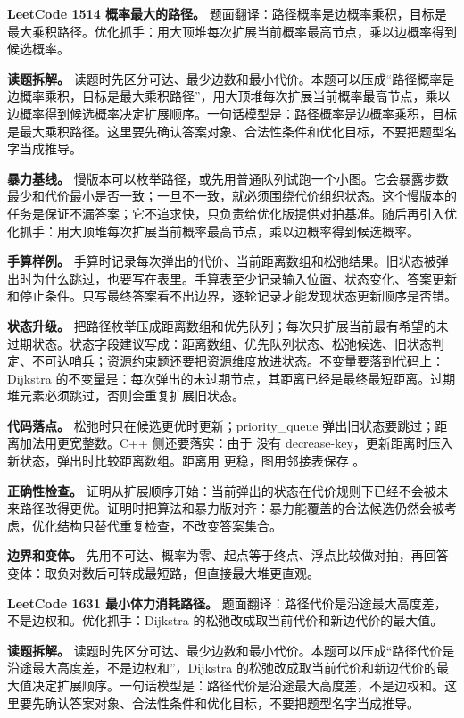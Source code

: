 \noindent\textbf{LeetCode 1514 概率最大的路径。} 题面翻译：路径概率是边概率乘积，目标是最大乘积路径。优化抓手：用大顶堆每次扩展当前概率最高节点，乘以边概率得到候选概率。

\textbf{读题拆解。} 读题时先区分可达、最少边数和最小代价。本题可以压成“路径概率是边概率乘积，目标是最大乘积路径”，用大顶堆每次扩展当前概率最高节点，乘以边概率得到候选概率决定扩展顺序。一句话模型是：路径概率是边概率乘积，目标是最大乘积路径。这里要先确认答案对象、合法性条件和优化目标，不要把题型名字当成推导。

\textbf{暴力基线。} 慢版本可以枚举路径，或先用普通队列试跑一个小图。它会暴露步数最少和代价最小是否一致；一旦不一致，就必须围绕代价组织状态。这个慢版本的任务是保证不漏答案；它不追求快，只负责给优化版提供对拍基准。随后再引入优化抓手：用大顶堆每次扩展当前概率最高节点，乘以边概率得到候选概率。

\textbf{手算样例。} 手算时记录每次弹出的代价、当前距离数组和松弛结果。旧状态被弹出时为什么跳过，也要写在表里。手算表至少记录输入位置、状态变化、答案更新和停止条件。只写最终答案看不出边界，逐轮记录才能发现状态更新顺序是否错。

\textbf{状态升级。} 把路径枚举压成距离数组和优先队列；每次只扩展当前最有希望的未过期状态。状态字段建议写成：距离数组、优先队列状态、松弛候选、旧状态判定、不可达哨兵；资源约束题还要把资源维度放进状态。不变量要落到代码上：Dijkstra 的不变量是：每次弹出的未过期节点，其距离已经是最终最短距离。过期堆元素必须跳过，否则会重复扩展旧状态。

\textbf{代码落点。} 松弛时只在候选更优时更新；priority\_queue 弹出旧状态要跳过；距离加法用更宽整数。C++ 侧还要落实：由于  没有 decrease-key，更新距离时压入新状态，弹出时比较距离数组。距离用  更稳，图用邻接表保存 。

\textbf{正确性检查。} 证明从扩展顺序开始：当前弹出的状态在代价规则下已经不会被未来路径改得更优。证明时把算法和暴力版对齐：暴力能覆盖的合法候选仍然会被考虑，优化结构只替代重复检查，不改变答案集合。

\textbf{边界和变体。} 先用不可达、概率为零、起点等于终点、浮点比较做对拍，再回答变体：取负对数后可转成最短路，但直接最大堆更直观。

\noindent\textbf{LeetCode 1631 最小体力消耗路径。} 题面翻译：路径代价是沿途最大高度差，不是边权和。优化抓手：Dijkstra 的松弛改成取当前代价和新边代价的最大值。

\textbf{读题拆解。} 读题时先区分可达、最少边数和最小代价。本题可以压成“路径代价是沿途最大高度差，不是边权和”，Dijkstra 的松弛改成取当前代价和新边代价的最大值决定扩展顺序。一句话模型是：路径代价是沿途最大高度差，不是边权和。这里要先确认答案对象、合法性条件和优化目标，不要把题型名字当成推导。

